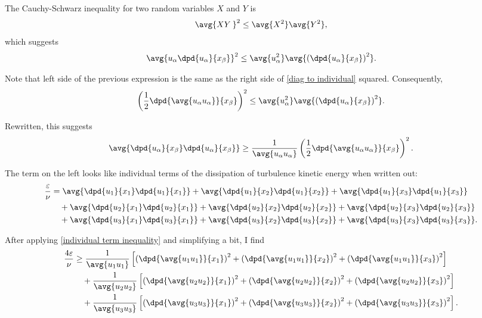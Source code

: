 \documentclass[ccbysa,note,git]{bmtreport}
\begin{document}
The Cauchy-Schwarz inequality for two random variables $X$ and $Y$ is
\begin{equation}
   \avg{X Y\kern2pt}^2 \leq \avg{X^2} \avg{Y^2},
\end{equation}
which suggests
\begin{equation}
   \avg{u_\alpha \dpd{u_\alpha}{x_\beta}}^2 \leq \avg{u_\alpha^2} \avg{\left(\dpd{u_\alpha}{x_\beta}\right)^2}.
\end{equation}

Note that left side of the previous expression is the same as the right side of \eqref{diag to individual} squared. Consequently,
\begin{equation}
   \left(\frac{1}{2} \dpd{\avg{u_\alpha u_\alpha}}{x_\beta}\right)^2 \leq \avg{u_\alpha^2} \avg{\left(\dpd{u_\alpha}{x_\beta}\right)^2}.
\end{equation}

Rewritten, this suggests
\begin{equation}
   \avg{\dpd{u_\alpha}{x_\beta} \dpd{u_\alpha}{x_\beta}} \geq \frac{1}{\avg{u_\alpha u_\alpha}} \left(\frac{1}{2} \dpd{\avg{u_\alpha u_\alpha}}{x_\beta}\right)^2. \label{eq:individual term inequality}
\end{equation}

The term on the left looks like individual terms of the dissipation of turbulence kinetic energy when written out:
\begin{align}
   \frac{\varepsilon}{\nu} &= \avg{\dpd{u_1}{x_1} \dpd{u_1}{x_1}} + \avg{\dpd{u_1}{x_2} \dpd{u_1}{x_2}} + \avg{\dpd{u_1}{x_3} \dpd{u_1}{x_3}} \notag \\
                           &\quad + \avg{\dpd{u_2}{x_1} \dpd{u_2}{x_1}} + \avg{\dpd{u_2}{x_2} \dpd{u_2}{x_2}} + \avg{\dpd{u_2}{x_3} \dpd{u_2}{x_3}} \notag \\
                           &\quad + \avg{\dpd{u_3}{x_1} \dpd{u_3}{x_1}} + \avg{\dpd{u_3}{x_2} \dpd{u_3}{x_2}} + \avg{\dpd{u_3}{x_3} \dpd{u_3}{x_3}}.
\end{align}

After applying \eqref{individual term inequality} and simplifying a bit, I find
\begin{align}
   \frac{4 \varepsilon}{\nu} &\geq \frac{1}{\avg{u_1 u_1}} \left[\left(\dpd{\avg{u_1 u_1}}{x_1}\right)^2 + \left(\dpd{\avg{u_1 u_1}}{x_2}\right)^2 + \left(\dpd{\avg{u_1 u_1}}{x_3}\right)^2\right] \notag \\
                             &\quad + \frac{1}{\avg{u_2 u_2}} \left[\left(\dpd{\avg{u_2 u_2}}{x_1}\right)^2 + \left(\dpd{\avg{u_2 u_2}}{x_2}\right)^2 + \left(\dpd{\avg{u_2 u_2}}{x_3}\right)^2\right] \notag \\
                             &\quad + \frac{1}{\avg{u_3 u_3}} \left[\left(\dpd{\avg{u_3 u_3}}{x_1}\right)^2 + \left(\dpd{\avg{u_3 u_3}}{x_2}\right)^2 + \left(\dpd{\avg{u_3 u_3}}{x_3}\right)^2\right]. \label{eq:diagonal reynolds stress inequality}
\end{align}
\end{document}
